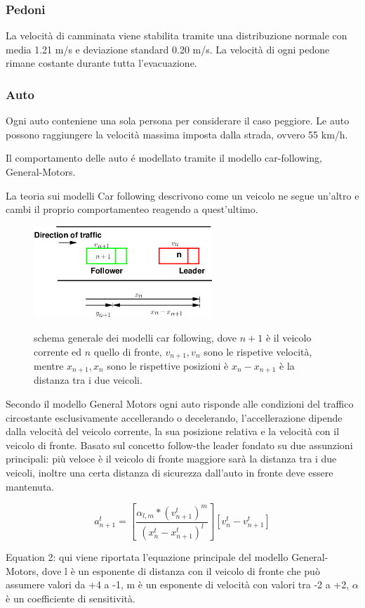 \subsubsection{Pedoni}
La velocità di camminata viene stabilita tramite una distribuzione normale
con media 1.21 m/s e deviazione standard 0.20 m/s.
La velocità di ogni pedone rimane costante durante tutta l'evacuazione.


\newpage
\subsubsection{Auto}
Ogni auto conteniene una sola persona per considerare il caso peggiore.
Le auto possono raggiungere la velocità massima imposta dalla strada, ovvero 55 km/h.

Il comportamento delle auto é modellato tramite il modello car-following, General-Motors.

La teoria sui modelli Car following descrivono come un veicolo ne segue un'altro
e cambi il proprio comportamenteo reagendo a quest'ultimo.

\begin{figure}[ht]
  \centering
  \includegraphics[width=0.6\textwidth]{images/GM.png}
  \label{fig:general-motors-img}
  \caption{schema generale dei modelli car following, dove $n+1$ è il veicolo corrente ed $n$ quello di fronte, $v_{n+1}, v_{n}$ sono le rispetive velocità, mentre $x_{n+1}, x_{n}$ sono le rispettive posizioni è $x_{n} - x_{n + 1}$ è la distanza tra i due veicoli.}
\end{figure}

Secondo il modello General Motors ogni auto risponde alle condizioni del traffico circostante esclusivamente accellerando o decelerando, l'accellerazione dipende dalla velocità del veicolo corrente, la sua posizione relativa e la velocità con il veicolo di fronte.
Basato sul concetto follow-the leader fondato su due assunzioni principali:
più veloce è il veicolo di fronte maggiore sarà la distanza tra i due veicoli,
inoltre una certa distanza di sicurezza dall'auto in fronte deve essere mantenuta.

\begin{equation}
  a_{n+1}^{t} = [ \frac{\alpha_{l, m} * (v_{n + 1}^{t})^{m} }{ (x_{n}^{t} - x_{n + 1}^{t})^{l}}][v_{n}^{t} - v_{n + 1}^{t}]
  \label{eq:general-motors-eq}
\end{equation}

\noindent
Equation 2: qui viene riportata l'equazione principale del modello General-Motors,
dove l è un esponente di distanza con il veicolo di fronte che può assumere valori da +4 a -1,
m è un esponente di velocità con valori tra -2 a +2, $\alpha$ è un coefficiente di sensitività.
